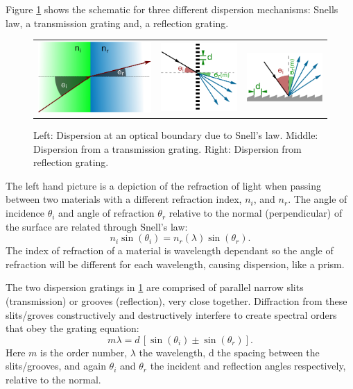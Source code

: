 Figure \cref{fig:dispersion_elements} shows the schematic for three different dispersion mechanisms: Snells law, a transmission grating and, a reflection grating.

\begin{figure}
    \centering
    \begin{tabular}{ccc}
   \includegraphics[width=0.3\linewidth]{figures/spectroscopy/snells_law} & \includegraphics[width=0.2\linewidth]{figures/spectroscopy/dispersion_grism-transmission} & \includegraphics[width=0.3\linewidth]{figures/spectroscopy/dispersion_grism-reflection} \\
\end{tabular}
    \caption[Dispersion mechanisms.]{Left: Dispersion at an optical boundary due to Snell's law.
        Middle: Dispersion from a transmission grating.
        Right: Dispersion from reflection grating.}
    \label{fig:dispersion_elements}
\end{figure}
The left hand picture is a depiction of the refraction of light when passing between two materials with a different refraction index, $n_{i}$, and $n_{r}$.
The angle of incidence $\theta_{i}$ and angle of refraction $\theta_{r}$ relative to the normal (perpendicular) of the surface are related through Snell's law:
\[n_{i} \sin(\theta_{i}) = n_{r}(\lambda) \sin(\theta_{r}).\]
The index of refraction of a material is wavelength dependant so the angle of refraction will be different for each wavelength, causing dispersion, like a prism.

The two dispersion gratings in \cref{fig:dispersion_elements} are comprised of parallel narrow slits (transmission) or grooves (reflection), very close together.
Diffraction from these slits/groves constructively and destructively interfere to create spectral orders that obey the grating equation:
\begin{equation}
m \lambda = d \, [\sin(\theta_{i}) \pm \sin(\theta_{r})].
\end{equation}
Here \(m\) is the order number, \(\lambda\) the wavelength, d the spacing between the slits/grooves, and again $\theta_{i}$ and $\theta_{r}$ the incident and reflection angles respectively, relative to the normal.


